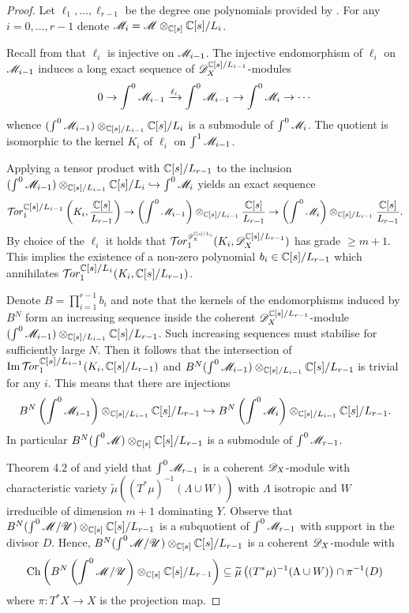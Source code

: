 \begin{proof}
  Let $\ell_1,\ldots,\ell_{r-1}$ be the degree one polynomials provided by .
  For any $i=0,\ldots, r-1$ denote $\mathscr{M}_i =  \mathscr{M} \otimes_{\mathbb{C}[s]} \mathbb{C}[s]/L_{i}$.

  Recall from  that $\ell_{i}$ is injective on $\mathscr{M}_{i-1}$.
  The injective endomorphism of $\ell_i$ on $\mathscr{M}_{i-1}$ induces a long exact sequence of $\mathscr{D}_X^{\mathbb{C}[s]/L_{i-1}}$-modules
  $$0 \to \int^0\mathscr{M}_{i-1} \xrightarrow{\ell_i} \int^0 \mathscr{M}_{i-1} \to \int^0 \mathscr{M}_i \to \cdots $$
  whence $(\int^0 \mathscr{M}_{i-1})\otimes_{\mathbb{C}[s]/L_{i-1}} \mathbb{C}[s]/L_i$ is a submodule of $\int^0\mathscr{M}_i$.
  The quotient is isomorphic to the kernel $K_i$ of $\ell_i$ on $\int^1\mathscr{M}_{i-1}$.

  Applying a tensor product with $\mathbb{C}[s]/L_{r-1}$ to the inclusion $(\int^0 \mathscr{M}_{i-1}) \otimes_{\mathbb{C}[s]/L_{i-1}} \mathbb{C}[s]/L_i \hookrightarrow \int^0\mathscr{M}_i$ yields an exact sequence
  $$\Tr{\C[s]/L_{i-1}}{1}\left(K_i, \frac{\C[s]}{L_{r-1}}\right) \to \left(\int^0 \M_{i-1}\right) \otimes_{\C[s]/L_{i-1}}\frac{\C[s]}{L_{r-1}} \to \left(\int^0\M_i\right) \otimes_{\C[s]/L_{i-1}}\frac{\C[s]}{L_{r-1}}.$$
  By choice of the $\ell_i$ it holds that $\Tr{\D_X^{\C[s]/L_i} }{1}(K_i, \D_X^{\C[s]/L_{r-1}})$ has grade $\geq m+1$.
  This implies the existence of a non-zero polynomial $b_i\in \mathbb{C}[s]/L_{r-1}$ which annihilates $\Tr{\C[s]/L_{i}}{1}(K_i, \C[s]/L_{r-1} )$.

  Denote $B = \prod_{i=1}^{r-1}b_i$ and note that the kernels of the endomorphisms induced by $B^N$ form an increasing sequence inside the coherent $\mathscr{D}_X^{\mathbb{C}[s]/L_{r-1}}$-module $(\int^0 \mathscr{M}_{i-1})\otimes_{\mathbb{C}[s]/L_{i-1}}\mathbb{C}[s]/L_{r-1}$.
  Such increasing sequences must stabilise for sufficiently large $N$.
  Then it follows that the intersection of $\img \Tr{\C[s]/L_{i-1}}{1}(K_i, \C[s]\allowbreak/L_{r-1})$ and $ B^N(\int^0 \mathscr{M}_{i-1}) \otimes_{\mathbb{C}[s]/L_{i-1}}\mathbb{C}[s]/L_{r-1}$ is trivial for any $i$.
  This means that there are injections $$B^N \left(\int^0 \mathscr{M}_{i-1}\right) \otimes_{\mathbb{C}[s]/L_{i-1}}\mathbb{C}[s]/L_{r-1} \hookrightarrow B^N \left(\int^0\mathscr{M}_i\right)\otimes_{\mathbb{C}[s]/L_{i-1}}\mathbb{C}[s]/L_{r-1}.$$
  In particular $B^N(\int^0\mathscr{M})\otimes_{\mathbb{C}[s]}\mathbb{C}[s]/L_{r-1}$ is a submodule of $\int^0\mathscr{M}_{r-1}$.


  Theorem 4.2 of \cite{kashiwara1976b} and  yield that $\int^0 \mathscr{M}_{r-1}$ is a coherent $\mathscr{D}_X$-module with characteristic variety $\widetilde{\mu}((T^*\mu)^{-1}(\Lambda\cup W))$ with $\Lambda$ isotropic and $W$ irreducible of dimension $m+1$ dominating $Y$.
  Observe that $B^N(\int^0\mathscr{M}/ \mathscr{U})\otimes_{\mathbb{C}[s]}\mathbb{C}[s]/L_{r-1}$ is a subquotient of $\int^0\mathscr{M}_{r-1}$ with support in the divisor $D$.
  Hence, $B^N(\int^0\mathscr{M}/ \mathscr{U})\otimes_{\mathbb{C}[s]}\mathbb{C}[s]/L_{r-1}$ is a coherent $\mathscr{D}_X$-module with
  $$\operatorname{Ch}\left( B^N\left(\int^0\mathscr{M}/ \mathscr{U}\right)\otimes_{\mathbb{C}[s]}\mathbb{C}[s]/L_{r-1} \right)\subseteq  \widetilde{\mu}\left((T^*\mu)^{-1}(\Lambda\cup W)\right) \cap \pi^{-1}(D)$$
  where $\pi:T^*X\to X$ is the projection map.


\end{proof}
